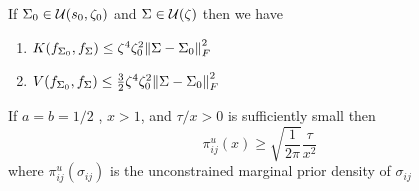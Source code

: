 % 



\begin{lemma*}
    If $\Sigma_0 \in \mathcal{U}(s_0, \zeta_0)$ and $\Sigma\in \mathcal{U}(\zeta)$ then we have 
    \begin{enumerate}
        \item $K(f_{\Sigma_0}, f_\Sigma)\leq \zeta^4\zeta_0^2 \norm{\Sigma-\Sigma_0}_F^2 $
        \item $V(f_{\Sigma_0}, f_\Sigma)\leq \frac 32 \zeta^4\zeta_0^2 \norm{\Sigma-\Sigma_0}_F^2 $
    \end{enumerate}
\end{lemma*}

\begin{lemma*}
    If $a=b=1/2$ , $x>1$, and $\tau/x >0$ is sufficiently small then \[\pi_{ij}^u(x)\geq \sqrt{\frac{1}{2\pi}} \frac{\tau}{x^2}\] where $\pi_{ij}^u(\sigma_{ij})$ is the unconstrained marginal prior density of $\sigma_{ij}$
\end{lemma*}

